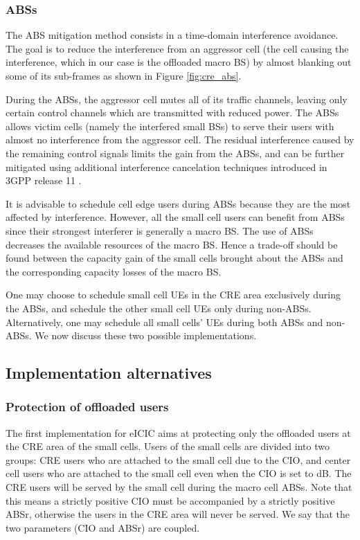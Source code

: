 \documentclass[conference]{IEEEtran}
\begin{document}
\subsubsection{\acp{ABS}}
	The \ac{ABS} mitigation method consists in a time-domain interference avoidance. The goal is to reduce the interference from an aggressor cell (the cell causing the interference, which in our case is the offloaded macro \ac{BS}) by almost blanking out some of its sub-frames as shown in Figure \ref{fig:cre_abs}.

	During the \acp{ABS}, the aggressor cell mutes all of its traffic channels, leaving only certain control channels which are transmitted with reduced power. The \acp{ABS} allows victim cells (namely the interfered small \acp{BS}) to serve their users with almost no interference from the aggressor cell. The residual interference caused by the remaining control signals limits the gain from the \acp{ABS}, and can be further mitigated using additional interference cancelation techniques introduced in 3GPP release 11 \cite[Section 16.1.5]{3gpp.36.300-R11}.
	
	It is advisable to schedule cell edge users during \acp{ABS} because they are the most affected by interference. However, all the small cell users can benefit from \acp{ABS} since their strongest interferer is generally a macro \ac{BS}. The use of \acp{ABS} decreases the available resources of the macro \ac{BS}. Hence a trade-off should be found between the capacity gain of the small cells brought about the \acp{ABS} and the corresponding capacity losses of the macro \ac{BS}.
	
	One may choose to schedule small cell \acp{UE} in the \ac{CRE} area exclusively during the \acp{ABS}, and schedule the other small cell \acp{UE} only during non-\acp{ABS}. Alternatively, one may schedule all small cells' \acp{UE} during both \acp{ABS} and non-\acp{ABS}. We now discuss these two possible implementations.

\subsection{Implementation alternatives}
\subsubsection{Protection of offloaded users} \label{Protectedcase}
	The first implementation for \ac{eICIC} aims at protecting only the offloaded users at the \ac{CRE} area of the small cells.
Users of the small cells are divided into two groups: \ac{CRE} users who are attached to the small cell due to the \ac{CIO}, and center cell users who are attached to the small cell even when the \ac{CIO} is set to dB. The \ac{CRE} users will be served by the small cell during the macro cell \acp{ABS}. Note that this means a strictly positive \ac{CIO} must be accompanied by a strictly positive \ac{ABSr}, otherwise the users in the \ac{CRE} area will never be served. We say that the two parameters (\ac{CIO} and \ac{ABSr}) are coupled.
		
\end{document}
